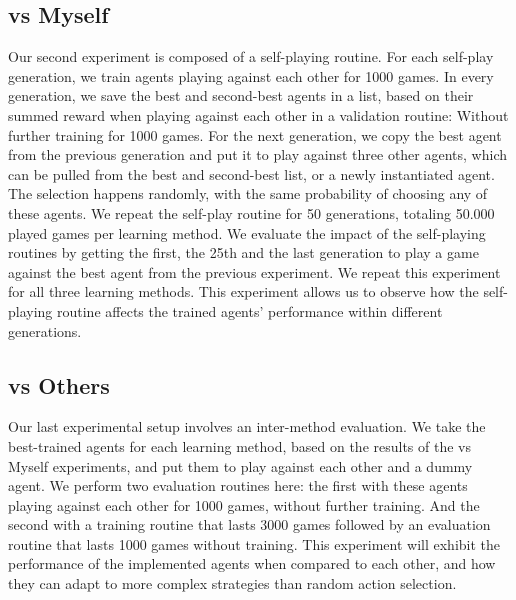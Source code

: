 \documentclass[a4paper,conference]{IEEEtran}
\begin{document}
\subsection{vs Myself}
Our second experiment is composed of a self-playing routine. For each self-play generation, we train agents playing against each other for 1000 games. In every generation, we save the best and second-best agents in a list, based on their summed reward when playing against each other in a validation routine: Without further training for 1000 games. For the next generation, we copy the best agent from the previous generation and put it to play against three other agents, which can be pulled from the best and second-best list, or a newly instantiated agent. The selection happens randomly, with the same probability of choosing any of these agents. We repeat the self-play routine for 50 generations, totaling 50.000 played games per learning method. We evaluate the impact of the self-playing routines by getting the first, the 25th and the last generation to play a game against the best agent from the previous experiment. We repeat this experiment for all three learning methods. This experiment allows us to observe how the self-playing routine affects the trained agents' performance within different generations.





\subsection{vs Others}

Our last experimental setup involves an inter-method evaluation. We take the best-trained agents for each learning method, based on the results of the vs Myself experiments, and put them to play against each other and a dummy agent. We perform two evaluation routines here: the first with these agents playing against each other for 1000 games, without further training. And the second with a training routine that lasts 3000 games followed by an evaluation routine that lasts 1000 games without training. This experiment will exhibit the performance of the implemented agents when compared to each other, and how they can adapt to more complex strategies than random action selection.
\end{document}
